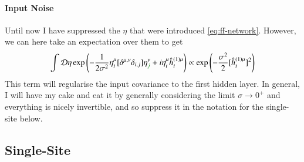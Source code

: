 \documentclass[../main.tex]{subfiles}
\begin{document}
\paragraph{Input Noise}

Until now I have suppressed the $\eta$ that were introduced  \eqref{eq:ff-network}. However, we can here take an expectation over them to get
\begin{align}
  \int \mathcal D \eta \exp \left(-\frac{1}{2\sigma^2} \eta^{\mu}_i [\delta^{\mu,\nu} \delta_{i,j}] \eta^{\nu}_{\typo{j}} + i \eta^{\mu}_i \hat h^{(1)\mu}_i \right)
  \propto
  \exp \left(-\frac{\sigma^2}{2} [\hat h^{(1)\mu}_i]^2 \right)
  \label{eq:single-site-reg}
\end{align}
This term will regularise the input covariance to the first hidden layer. In general, I will have my cake and eat it by generally considering the limit $\sigma \rightarrow 0^+$ and everything is nicely invertible, and so suppress it in the notation for the single-site below.  

\subsection{Single-Site}
\end{document}
